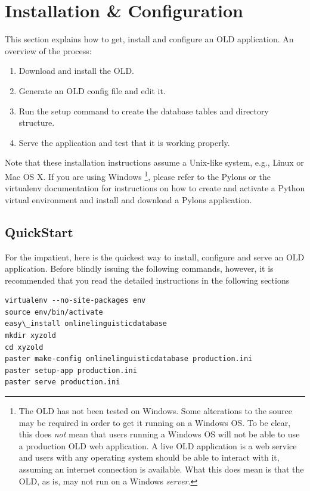 \documentclass[letterpaper,10pt,english]{sphinxmanual}
\begin{document}
\section{Installation \& Configuration}
\label{installation:installation-section}\label{installation::doc}\label{installation:installation-configuration}
This section explains how to get, install and configure an OLD application.  An
overview of the process:
\begin{enumerate}
\item {} 
Download and install the OLD.

\item {} 
Generate an OLD config file and edit it.

\item {} 
Run the setup command to create the database tables and directory structure.

\item {} 
Serve the application and test that it is working properly.

\end{enumerate}

Note that these installation instructions assume a Unix-like system, e.g.,
Linux or Mac OS X.  If you are using Windows \footnote{
The OLD has not been tested on Windows.  Some alterations to the source
may be required in order to get it running on a Windows OS.  To be clear,
this does \emph{not} mean that users running a Windows OS will not be able to use
a production OLD web application.  A live OLD application is a web service
and users with any operating system should be able to interact with it,
assuming an internet connection is available.  What this does mean is that
the OLD, as is, may not run on a Windows \emph{server}.
}, please refer to the Pylons
or the virtualenv documentation for instructions on how to create and activate
a Python virtual environment and install and download a Pylons application.


\subsection{QuickStart}
\label{installation:quickstart}
For the impatient, here is the quickest way to install, configure and serve an
OLD application.  Before blindly issuing the following commands, however, it is
recommended that you read the detailed instructions in the following sections

\begin{Verbatim}[commandchars=\\\{\}]
virtualenv --no-site-packages env
source env/bin/activate
easy\_install onlinelinguisticdatabase
mkdir xyzold
cd xyzold
paster make-config onlinelinguisticdatabase production.ini
paster setup-app production.ini
paster serve production.ini
\end{Verbatim}
\end{document}
